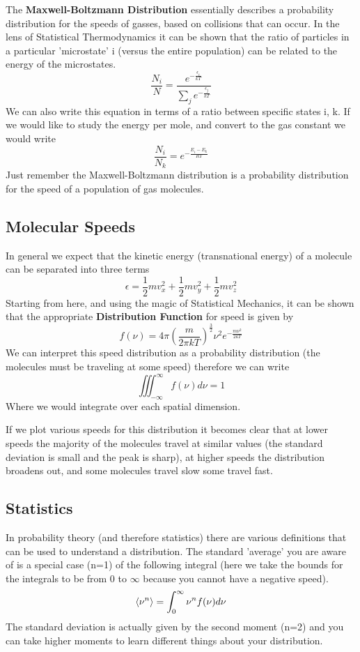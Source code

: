 \documentclass{article}
\newcommand{\be}{\begin{equation}}
\newcommand{\ee}{\end{equation}}
\begin{document}
The \textbf{Maxwell-Boltzmann Distribution} essentially describes a probability distribution for the speeds of gasses, based on collisions that can occur. 
In the lens of Statistical Thermodynamics it can be shown that the ratio of particles in a particular 'microstate' i (versus the entire population) can be related to the energy of the microstates.
\be
\frac{N_i}{N} = \frac{e^{-\frac{\epsilon_i}{kT}}}{\displaystyle \sum_j e^{-\frac{\epsilon_j}{kT}}}
\ee
We can also write this equation in terms of a ratio between specific states i, k. 
If we would like to study the energy per mole, and convert to the gas constant we would write
\be
\frac{N_i}{N_k} = e^{-\frac{E_i-E_k}{RT}}
\ee
Just remember the Maxwell-Boltzmann distribution is a probability distribution for the speed of a population of gas molecules. 

\subsection*{Molecular Speeds}
In general we expect that the kinetic energy (transnational energy) of a molecule can be separated into three terms 
\be
\epsilon = \frac{1}{2}mv_x^2 + \frac{1}{2}mv_y^2 + \frac{1}{2}mv_z^2
\ee
Starting from here, and using the magic of Statistical Mechanics, it can be shown that the appropriate \textbf{Distribution Function} for speed is given by 
\be
f(\nu) = 4\pi \left(\frac{m}{2\pi kT}\right)^{\frac{3}{2}}\nu^2e^{-\frac{m\nu^2}{2kT}}
\ee
We can interpret this speed distribution as a probability distribution (the molecules must be traveling at some speed) therefore we can write
\be
\iiint_{-\infty}^\infty f(\nu)d\nu = 1
\ee
Where we would integrate over each spatial dimension. 

If we plot various speeds for this distribution it becomes clear that at lower speeds the majority of the molecules travel at similar values (the standard deviation is small and the peak is sharp), at higher speeds the distribution broadens out, and some molecules travel slow some travel fast.

\subsection*{Statistics}
In probability theory (and therefore statistics) there are various definitions that can be used to understand a distribution.
The standard 'average' you are aware of is a special case (n=1) of the following integral (here we take the bounds for the integrals to be from 0 to $\infty$ because you cannot have a negative speed).
\be
\braket{\nu^n} = \int_0^\infty \nu^n f(\nu) d\nu
\ee
The standard deviation is actually given by the second moment (n=2) and you can take higher moments to learn different things about your distribution. 
\end{document}
